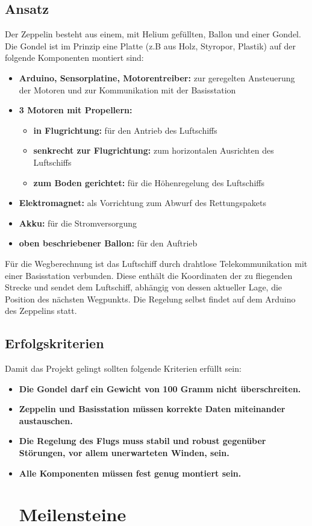 \documentclass[lang=ngerman,inputenc=utf8,fontsize=10pt]{ldvarticle}
\begin{document}
\subsection*{Ansatz}
Der Zeppelin besteht aus einem, mit Helium gefüllten, Ballon und einer Gondel. Die Gondel ist im Prinzip eine Platte (z.B aus Holz, Styropor, Plastik) auf der folgende Komponenten montiert sind:
\begin{itemize}
\item \textbf{Arduino, Sensorplatine, Motorentreiber:} zur geregelten Ansteuerung der Motoren und zur Kommunikation mit der Basisstation
\item \textbf{3 Motoren mit Propellern:}
\begin{itemize}
\item \textbf{in Flugrichtung:} für den Antrieb des Luftschiffs
\item \textbf{senkrecht zur Flugrichtung:} zum horizontalen Ausrichten des Luftschiffs
\item \textbf{zum Boden gerichtet:} für die Höhenregelung des Luftschiffs
\end{itemize}
\item \textbf{Elektromagnet:} als Vorrichtung zum Abwurf des Rettungspakets
\item \textbf{Akku:} für die Stromversorgung
\item \textbf{oben beschriebener Ballon:} für den Auftrieb
\end{itemize}

Für die Wegberechnung ist das Luftschiff durch drahtlose Telekommunikation mit einer Basisstation verbunden. Diese enthält die Koordinaten der zu fliegenden Strecke und sendet dem Luftschiff, abhängig von dessen aktueller Lage, die Position des nächsten Wegpunkts. Die Regelung selbst findet auf dem Arduino des Zeppelins statt.

\subsection*{Erfolgskriterien}
Damit das Projekt gelingt sollten folgende Kriterien erfüllt sein:
\begin{itemize}
\item \textbf{Die Gondel darf ein Gewicht von 100 Gramm nicht überschreiten.}
\item \textbf{Zeppelin und Basisstation müssen korrekte Daten miteinander austauschen.}
\item \textbf{Die Regelung des Flugs muss stabil und robust gegenüber Störungen, vor allem unerwarteten Winden, sein.}
\item \textbf{Alle Komponenten müssen fest genug montiert sein.}
\section{Meilensteine}
\end{itemize}
\end{document}
